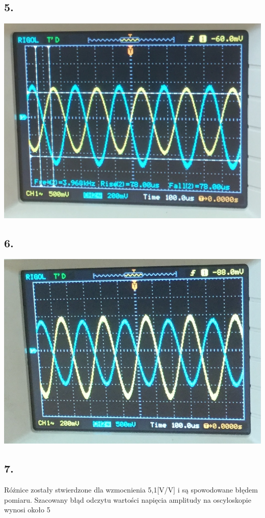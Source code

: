\documentclass[polish,a4paper]{article}
\begin{document}
\subsection*{5.}
\includegraphics[scale=0.5]{czestotliwosc}
\subsection*{6.}
\includegraphics[scale=0.5]{k_odwracajaca}
\subsection*{7.}
Różnice zostały stwierdzone dla wzmocnienia 5,1[V/V] i są spowodowane błędem pomiaru. Szacowany błąd odczytu wartości napięcia amplitudy na oscyloskopie wynosi około 5%
\end{document}
